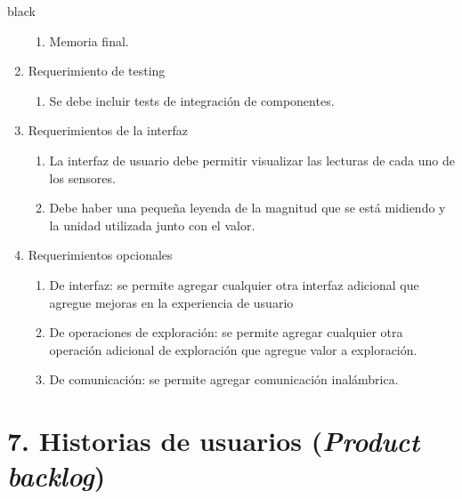 \documentclass[
11pt, %
codirector, %
]{charter}
\begin{document}
\begin{consigna}{black}
\begin{enumerate}
\begin{enumerate}
			\item Memoria final.	
		\end{enumerate}	
	\item Requerimiento de testing		
		\begin{enumerate}			
			\item Se debe incluir tests de integración de componentes.		
		\end{enumerate}	
	\item Requerimientos de la interfaz		
		\begin{enumerate}			
			\item La interfaz de usuario debe permitir visualizar las lecturas de cada uno de los sensores.			
			\item Debe haber una pequeña leyenda de la magnitud que se está midiendo y la unidad utilizada junto con el valor.		
		\end{enumerate}	
	\item Requerimientos opcionales		
		\begin{enumerate}			
			\item De interfaz: se permite agregar cualquier otra interfaz adicional que agregue mejoras en la experiencia de usuario			
			\item De operaciones de exploración: se permite agregar cualquier otra operación adicional de exploración que agregue valor a exploración.	
			\item De comunicación: se permite agregar comunicación inalámbrica.		
	\end{enumerate}
\end{enumerate}




\end{consigna}

\section{7. Historias de usuarios (\textit{Product backlog})}
\label{sec:backlog}
\end{document}
